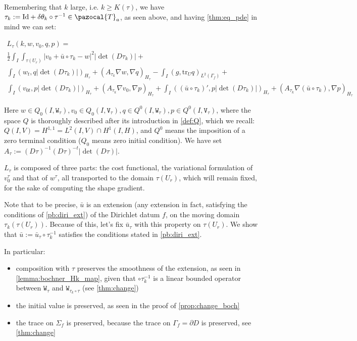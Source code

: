 \documentclass[english,a4paper,9pt,oneside]{scrbook}	%
\theoremstyle{break}
\theoremstyle{remark}
\newcommand{\tr}{\text{tr}}
\newcommand{\cT}{\pazocal{T}}
\newcommand{\id}{\text{Id}}
\newcommand{\te}{\theta}
\newcommand{\tw}[1]{\texttt{#1}}
\begin{document}
Remembering that $k$ large, i.e. $k\geq K(\tau)$, we have $\tau_k:=\id+\delta\te_k \circ \tau^{-1} \in \cT_a$, as seen above, and  having \cref{thm:eq_pde} in mind we can set:

\begin{align*}
L_\tau(k,w,v_0,q,p) = \\
\frac{1}{2}\int_I \int_{\tau(U_r)}|v_0+\bar{u} \circ \tau_k - w|^2|\det(D\tau_k)|+\\
\int_I ( w_t , q |\det(D\tau_k)|)_{H_\tau}+ (A_{\tau_k}\nabla w, \nabla q)_{H_\tau} -\int_I(g,\tr_{U} q)_{L^2(\Gamma_f)} +\\ \int_I (v_{0t},p |\det(D\tau_k)|)_{H_\tau} + (A_{\tau_k} \nabla v_0, \nabla p)_{H_\tau}+\int_I((\bar{u}\circ \tau_k)',p|\det(D\tau_k)|)_{H_\tau}+(A_{\tau_k} \nabla (\bar{u} \circ \tau_k), \nabla p)_{H_\tau}
\end{align*}

Here $w \in Q_0(I, \tw{W}_\tau), v_0 \in Q_0(I,\tw{V}_\tau), q \in Q^0(I, \tw{W}_\tau), p \in Q^0(I, \tw{V}_\tau)$, where the space $Q$ is thoroughly described after its introduction in \cref{def:Q}, which we recall: $Q(I,V)=H^{1,1}=L^2(I,V)\cap H^1(I,H)$, and $Q^0$ means the imposition of a zero terminal condition ($Q_0$ means zero initial condition). We have set $A_\tau:=  (D\tau)^{-1}(D\tau)^{-t}|\det(D\tau)|$.

$L_\tau$ is composed of three parts: the cost functional, the variational formulation of $v_0^\tau$ and that of $w^\tau$, all transported to the domain $\tau(U_r)$, which will remain fixed, for the sake of computing the shape gradient.

Note that to be precise, $\bar{u}$ is an extension (any extension in fact, satisfying the conditions of \cref{pb:diri_ext}) of the Dirichlet datum $f$, on the moving domain $\tau_k(\tau(U_r))$. Because of this, let's fix $\bar{u}_\tau$ with this property on $\tau(U_r)$. We show that $\bar{u}:=\bar{u}_\tau\circ \tau_k^{-1}$ satisfies the conditions stated in \cref{pb:diri_ext}. 

In particular:

\begin{itemize}
	\item composition with $\tau$ preserves the smoothness of the extension, as seen in \cref{lemma:bochner_Hk_map}, given that $\circ \tau_k^{-1}$ is a linear bounded operator between $\tw{W}_\tau$ and $\tw{W}_{\tau_k \circ \tau}$ (see \cref{thm:change})
	\item the initial value is preserved, as seen in the proof of \cref{prop:change_boch}
	\item the trace on $\Sigma_f$ is preserved, because the trace on $\Gamma_f=\partial D$ is preserved, see \cref{thm:change}
\end{itemize}
\end{document}
